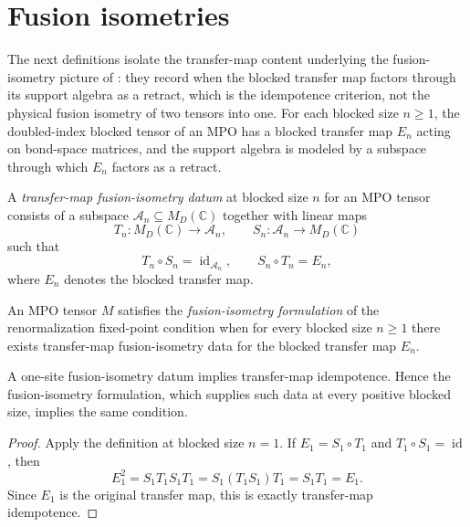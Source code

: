 \section{Fusion isometries}

The next definitions isolate the transfer-map content underlying the
fusion-isometry picture of \cite[Section~4.5]{Cirac2016MPDO_arXiv}: they record
when the blocked transfer map factors through its support algebra as a retract,
which is the idempotence criterion, not the physical fusion isometry of two
tensors into one. For each blocked size $n \ge 1$, the doubled-index blocked
tensor of an MPO has a blocked transfer map $E_n$ acting on bond-space matrices,
and the support algebra is modeled by a subspace through which $E_n$ factors as
a retract.

\begin{definition}%
    \label{def:mpdo_fusion_isometry}
    \leanok
    A \emph{transfer-map fusion-isometry datum} at blocked size $n$ for an
    MPO tensor consists of a subspace $\mathcal{A}_n \subseteq M_D(\mathbb{C})$
    together with linear maps
    $$T_n : M_D(\mathbb{C}) \to \mathcal{A}_n, \qquad
        S_n : \mathcal{A}_n \to M_D(\mathbb{C})$$
    such that
    $$T_n \circ S_n = \operatorname{id}_{\mathcal{A}_n},
        \qquad S_n \circ T_n = E_n,$$
    where $E_n$ denotes the blocked transfer map.
\end{definition}

\begin{definition}%
    \label{def:mpdo_rfp_via_fusion}
    \leanok
    An MPO tensor $M$ satisfies the \emph{fusion-isometry formulation} of the
    renormalization fixed-point condition when for every blocked size $n \ge 1$
    there exists transfer-map fusion-isometry data for the blocked transfer
    map $E_n$.
\end{definition}

\begin{theorem}%
    \label{thm:mpdo_rfp_of_fusion}
    \leanok
    A one-site fusion-isometry datum implies transfer-map idempotence. Hence the
    fusion-isometry formulation, which supplies such data at every positive
    blocked size, implies the same condition.
\end{theorem}
\begin{proof}\leanok
    Apply the definition at blocked size $n = 1$.
    If $E_1 = S_1 \circ T_1$ and $T_1 \circ S_1 = \operatorname{id}$, then
    $$E_1^2 = S_1 T_1 S_1 T_1 = S_1 (T_1 S_1) T_1 = S_1 T_1 = E_1.$$
    Since $E_1$ is the original transfer map, this is exactly transfer-map
    idempotence.
\end{proof}


